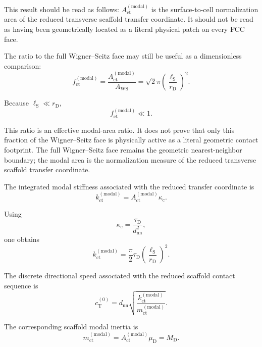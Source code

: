 This result should be read as follows: $A_{\mathrm{ct}}^{(\mathrm{modal})}$ is the surface-to-cell normalization area of the reduced transverse scaffold transfer coordinate. It should not be read as having been geometrically located as a literal physical patch on every FCC face.

The ratio to the full Wigner--Seitz face may still be useful as a dimensionless comparison:
\begin{equation}
    f_{\mathrm{ct}}^{(\mathrm{modal})} = \frac{A_{\mathrm{ct}}^{(\mathrm{modal})}}{A_{\mathrm{WS}}} = \sqrt{2}\pi \left( \frac{\ell_{\mathrm{S}}}{r_{\mathrm{D}}} \right)^2.
\end{equation}

Because $\ell_{\mathrm{S}} \ll r_{\mathrm{D}}$,
\begin{equation}
    f_{\mathrm{ct}}^{(\mathrm{modal})} \ll 1.
\end{equation}

This ratio is an effective modal-area ratio. It does not prove that only this fraction of the Wigner--Seitz face is physically active as a literal geometric contact footprint. The full Wigner--Seitz face remains the geometric nearest-neighbor boundary; the modal area is the normalization measure of the reduced transverse scaffold transfer coordinate.

The integrated modal stiffness associated with the reduced transfer coordinate is
\begin{equation}
    k_{\mathrm{ct}}^{(\mathrm{modal})} = A_{\mathrm{ct}}^{(\mathrm{modal})}\kappa_{\mathrm{c}}.
\end{equation}

Using
\begin{equation}
    \kappa_{\mathrm{c}} = \frac{\tau_{\mathrm{D}}}{d_{\mathrm{nn}}^2},
\end{equation}
one obtains
\begin{equation}
    k_{\mathrm{ct}}^{(\mathrm{modal})} = \frac{\pi}{2}\tau_{\mathrm{D}} \left( \frac{\ell_{\mathrm{S}}}{r_{\mathrm{D}}} \right)^2.
\end{equation}

The discrete directional speed associated with the reduced scaffold contact sequence is
\begin{equation}
    c_{\mathrm{T}}^{(0)} = d_{\mathrm{nn}} \sqrt{\frac{k_{\mathrm{ct}}^{(\mathrm{modal})}}{m_{\mathrm{ct}}^{(\mathrm{modal})}}}.
\end{equation}

The corresponding scaffold modal inertia is
\begin{equation}
    m_{\mathrm{ct}}^{(\mathrm{modal})} = A_{\mathrm{ct}}^{(\mathrm{modal})}\mu_{\mathrm{D}} = M_{\mathrm{D}}.
\end{equation}

